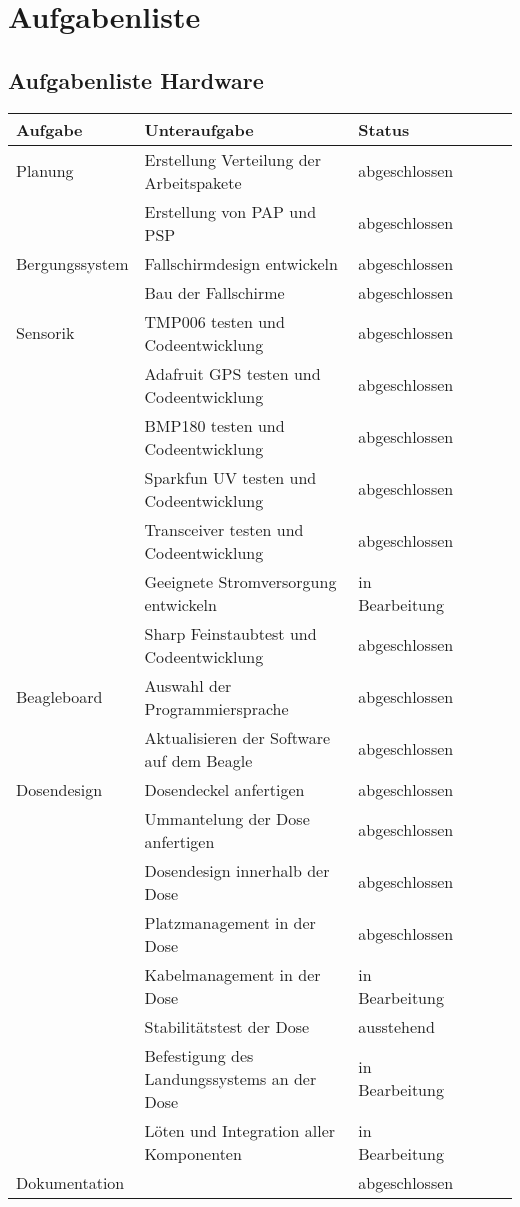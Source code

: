 \section{Aufgabenliste}

\subsection{Aufgabenliste Hardware}
\begin{table}[H]
  \centering
    \begin{tabular}{p{3cm}p{7cm}p{3cm}rrr}
    \toprule
    \textbf{Aufgabe} & \textbf{Unteraufgabe} & \textbf{Status} \\
    \midrule
	Planung & Erstellung Verteilung der Arbeitspakete & abgeschlossen \\
	& Erstellung von PAP und PSP & abgeschlossen \\
	\midrule
	Bergungssystem & Fallschirmdesign entwickeln & abgeschlossen\\
	& Bau der Fallschirme & abgeschlossen\\
	\midrule
	Sensorik & TMP006 testen und Codeentwicklung & abgeschlossen\\
	& Adafruit GPS testen und Codeentwicklung & abgeschlossen\\
	& BMP180 testen und Codeentwicklung & abgeschlossen\\
	& Sparkfun UV testen und Codeentwicklung & abgeschlossen\\
	& Transceiver testen und Codeentwicklung & abgeschlossen\\
	& Geeignete Stromversorgung entwickeln & in Bearbeitung\\
	& Sharp Feinstaubtest und Codeentwicklung & abgeschlossen\\
	\midrule
	Beagleboard & Auswahl der Programmiersprache & abgeschlossen\\
	& Aktualisieren der Software auf dem Beagle & abgeschlossen\\
	\midrule
	Dosendesign & Dosendeckel anfertigen & abgeschlossen\\
	& Ummantelung der Dose anfertigen & abgeschlossen\\
	& Dosendesign innerhalb der Dose & abgeschlossen\\
	& Platzmanagement in der Dose & abgeschlossen\\
	& Kabelmanagement in der Dose & in Bearbeitung\\
	& Stabilitätstest der Dose & ausstehend\\
	& Befestigung des Landungssystems an der Dose & in Bearbeitung\\
	& Löten und Integration aller Komponenten & in Bearbeitung\\
  \midrule
  Dokumentation & & abgeschlossen \\
  \bottomrule
  \bottomrule
  \end{tabular}%
  \label{tab:aufgabenliste_hardware}%
\end{table}%

